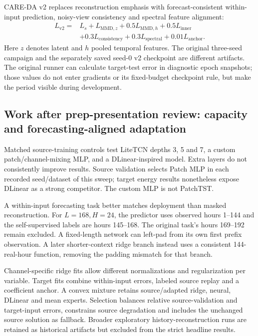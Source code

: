 \documentclass[twoside,english]{article}
\begin{document}
CARE-DA v2 replaces reconstruction emphasis with forecast-consistent within-input prediction, noisy-view consistency and spectral feature alignment:
\begin{align}
L_{\mathrm{v2}}={}&L_s+L_{\mathrm{MMD},z}+0.5L_{\mathrm{MMD},h}+0.5L_{\mathrm{inner}}\nonumber\\
&+0.3L_{\mathrm{consistency}}+0.3L_{\mathrm{spectral}}+0.01L_{\mathrm{anchor}}.
\end{align}
Here $z$ denotes latent and $h$ pooled temporal features. The original three-seed campaign and the separately saved seed-0 v2 checkpoint are different artifacts. The original runner can calculate target-test error in diagnostic epoch snapshots; those values do not enter gradients or its fixed-budget checkpoint rule, but make the period visible during development.

\subsection{Work after prep-presentation review: capacity and forecasting-aligned adaptation}
Matched source-training controls test LiteTCN depths 3, 5 and 7, a custom patch/channel-mixing MLP, and a DLinear-inspired model. Extra layers do not consistently improve results. Source validation selects Patch MLP in each recorded seed/dataset of this sweep; target energy results nonetheless expose DLinear as a strong competitor. The custom MLP is not PatchTST.

A within-input forecasting task better matches deployment than masked reconstruction. For $L=168,H=24$, the predictor uses observed hours 1--144 and the self-supervised labels are hours 145--168. The original task's hours 169--192 remain excluded. A fixed-length network can left-pad from its own first prefix observation. A later shorter-context ridge branch instead uses a consistent 144-real-hour function, removing the padding mismatch for that branch.

Channel-specific ridge fits allow different normalizations and regularization per variable. Target fits combine within-input errors, labeled source replay and a coefficient anchor. A convex mixture retains source/adapted ridge, neural, DLinear and mean experts. Selection balances relative source-validation and target-input errors, constrains source degradation and includes the unchanged source solution as fallback. Broader exploratory history-reconstruction runs are retained as historical artifacts but excluded from the strict headline results.
\end{document}
